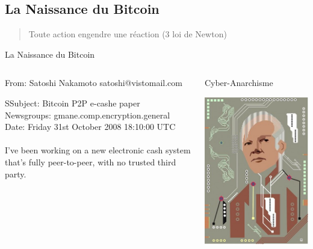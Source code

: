 \documentclass[presentation]{beamer}
\begin{document}
\subsection{La Naissance du Bitcoin}
\label{sec:org33f371e}
\begin{frame}[label={sec:orgaf2e55a}]{}
\begin{verse}
Toute action engendre une réaction (3\ieme{} loi de Newton)\\
\end{verse}
\end{frame}
\begin{frame}[label={sec:org1e2cafc}]{La Naissance du Bitcoin}
\begin{columns}
\begin{column}{0.70\columnwidth}
\begin{block}{From: Satoshi Nakamoto satoshi@vistomail.com}
\begin{verbatiminput}
SSubject: Bitcoin P2P e-cashe paper\\
Newsgroups: gmane.comp.encryption.general\\
Date: Friday 31st October 2008 18:10:00 UTC\\
~\\
I've been working on a new electronic cash system that's fully peer-to-peer, with no trusted third party.
\end{verbatiminput}
\end{block}
\end{column}
\begin{column}{0.30\columnwidth}
\begin{block}{Cyber-Anarchisme}
\begin{center}
\includegraphics[width=.7\linewidth]{Pictures/assange.jpg}
\end{center}
\end{block}
\end{column}
\end{columns}
\end{frame}
\end{document}
